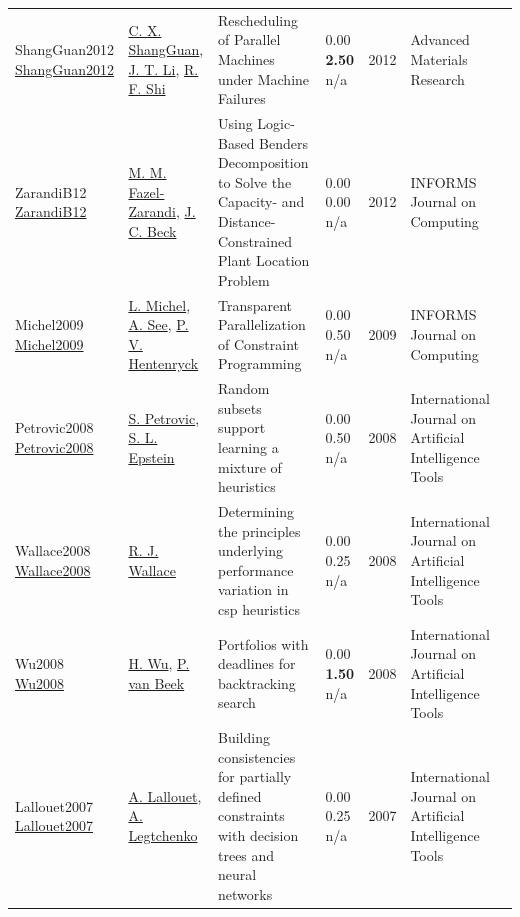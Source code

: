 {\begin{longtable}{p{3cm}p{5cm}p{10cm}p{1cm}rp{2.5cm}l}
ShangGuan2012 \href{http://dx.doi.org/10.4028/www.scientific.net/amr.443-444.724}{ShangGuan2012} & \hyperref[auth:a1980]{C. X. ShangGuan}, \hyperref[auth:a1981]{J. T. Li}, \hyperref[auth:a1982]{R. F. Shi} & Rescheduling of Parallel Machines under Machine Failures & \noindent{}\textcolor{black!50}{0.00} \textbf{2.50} n/a & 2012 & Advanced Materials Research & \cite{ShangGuan2012}\\
ZarandiB12 \href{http://dx.doi.org/10.1287/ijoc.1110.0458}{ZarandiB12} & \hyperref[auth:a944]{M. M. Fazel-Zarandi}, \hyperref[auth:a89]{J. C. Beck} & Using Logic-Based Benders Decomposition to Solve the Capacity- and Distance-Constrained Plant Location Problem & \noindent{}\textcolor{black!50}{0.00} \textcolor{black!50}{0.00} n/a & 2012 & \cellcolor{red!20}INFORMS Journal on Computing & \cite{ZarandiB12}\\
Michel2009 \href{http://dx.doi.org/10.1287/ijoc.1080.0313}{Michel2009} & \hyperref[auth:a32]{L. Michel}, \hyperref[auth:a1804]{A. See}, \hyperref[auth:a148]{P. V. Hentenryck} & Transparent Parallelization of Constraint Programming & \noindent{}\textcolor{black!50}{0.00} 0.50 n/a & 2009 & \cellcolor{red!20}INFORMS Journal on Computing & \cite{Michel2009}\\
Petrovic2008 \href{http://dx.doi.org/10.1142/s0218213008004023}{Petrovic2008} & \hyperref[auth:a1858]{S. Petrovic}, \hyperref[auth:a1859]{S. L. Epstein} & \cellcolor{green!10}Random subsets support learning a mixture of heuristics & \noindent{}\textcolor{black!50}{0.00} 0.50 n/a & 2008 & International Journal on Artificial Intelligence Tools & \cite{Petrovic2008}\\
Wallace2008 \href{http://dx.doi.org/10.1142/s0218213008004199}{Wallace2008} & \hyperref[auth:a1267]{R. J. Wallace} & Determining the principles underlying performance variation in csp heuristics & \noindent{}\textcolor{black!50}{0.00} 0.25 n/a & 2008 & International Journal on Artificial Intelligence Tools & \cite{Wallace2008}\\
Wu2008 \href{http://dx.doi.org/10.1142/s0218213008004187}{Wu2008} & \hyperref[auth:a2057]{H. Wu}, \hyperref[auth:a609]{P. van Beek} & Portfolios with deadlines for backtracking search & \noindent{}\textcolor{black!50}{0.00} \textbf{1.50} n/a & 2008 & International Journal on Artificial Intelligence Tools & \cite{Wu2008}\\
Lallouet2007 \href{http://dx.doi.org/10.1142/s0218213007003503}{Lallouet2007} & \hyperref[auth:a427]{A. Lallouet}, \hyperref[auth:a1932]{A. Legtchenko} & Building consistencies for partially defined constraints with decision trees and neural networks & \noindent{}\textcolor{black!50}{0.00} 0.25 n/a & 2007 & International Journal on Artificial Intelligence Tools & \cite{Lallouet2007}\\

\end{longtable}}
